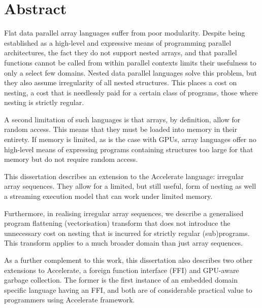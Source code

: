 \chapter{Abstract}


Flat data parallel array languages suffer from poor modularity. Despite being established as a high-level and expressive means of programming parallel architectures, the fact they do not support nested arrays, and that parallel functions cannot be called from within parallel contexts limits their usefulness to only a select few domains. Nested data parallel languages solve this problem, but they also assume irregularity of all nested structures. This places a cost on nesting, a cost that is needlessly paid for a certain class of programs, those where nesting is strictly regular.

A second limitation of such languages is that arrays, by definition, allow for random access. This means that they must be loaded into memory in their entirety. If memory is limited, as is the case with GPUs, array languages offer no high-level means of expressing programs containing structures too large for that memory but do not require random access.

This dissertation describes an extension to the Accelerate language: irregular array sequences. They allow for a limited, but still useful, form of nesting as well a streaming execution model that can work under limited memory.

Furthermore, in realising irregular array sequences, we describe a generalised program flattening (vectorisation) transform that does not introduce the unnecessary cost on nesting that is incurred for strictly regular (sub)programs. This transform applies to a much broader domain than just array sequences.

As a further complement to this work, this dissertation also describes two other extensions to Accelerate, a foreign function interface (FFI) and GPU-aware garbage collection. The former is the first instance of an embedded domain specific language having an FFI, and both are of considerable practical value to programmers using Accelerate framework.

